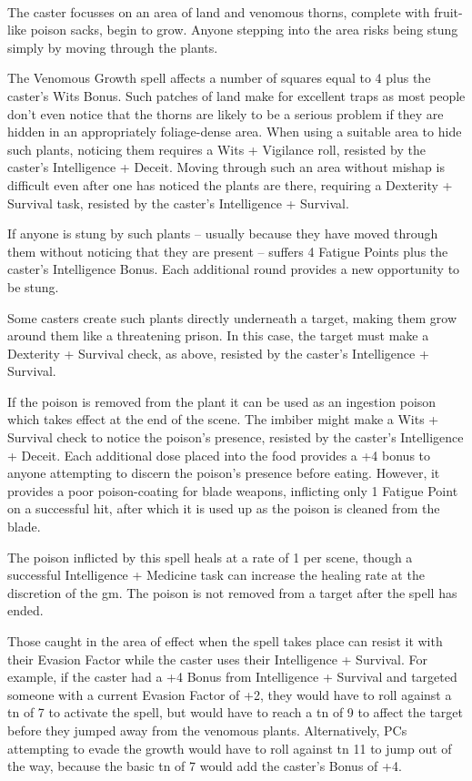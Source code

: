 \begin{multicols}{2}
\\
The caster focusses on an area of land and venomous thorns, complete with fruit-like poison sacks, begin to grow. Anyone stepping into the area risks being stung simply by moving through the plants.

The Venomous Growth spell affects a number of squares equal to 4 plus the caster's Wits Bonus. Such patches of land make for excellent traps as most people don't even notice that the thorns are likely to be a serious problem if they are hidden in an appropriately foliage-dense area. When using a suitable area to hide such plants, noticing them requires a Wits + Vigilance roll, resisted by the caster's Intelligence + Deceit. Moving through such an area without mishap is difficult even after one has noticed the plants are there, requiring a Dexterity + Survival task, resisted by the caster's Intelligence + Survival.

If anyone is stung by such plants -- usually because they have moved through them without noticing that they are present -- suffers 4 Fatigue Points plus the caster's Intelligence Bonus. Each additional \gls{round} provides a new opportunity to be stung.

Some casters create such plants directly underneath a target, making them grow around them like a threatening prison. In this case, the target must make a Dexterity + Survival check, as above, resisted by the caster's Intelligence + Survival.

If the poison is removed from the plant it can be used as an ingestion poison which takes effect at the end of the scene. The imbiber might make a Wits + Survival check to notice the poison's presence, resisted by the caster's Intelligence + Deceit. Each additional dose placed into the food provides a +4 bonus to anyone attempting to discern the poison's presence before eating. However, it provides a poor poison-coating for blade weapons, inflicting only 1 Fatigue Point on a successful hit, after which it is used up as the poison is cleaned from the blade.

The poison inflicted by this spell heals at a rate of 1 per scene, though a successful Intelligence + Medicine task can increase the healing rate at the discretion of the \gls{gm}. The poison is not removed from a target after the spell has ended.

Those caught in the area of effect when the spell takes place can resist it with their Evasion Factor while the caster uses their Intelligence + Survival. For example, if the caster had a +4 Bonus from Intelligence + Survival and targeted someone with a current Evasion Factor of +2, they would have to roll against a \gls{tn} of 7 to activate the spell, but would have to reach a \gls{tn} of 9 to affect the target before they jumped away from the venomous plants. Alternatively, PCs attempting to evade the growth would have to roll against \gls{tn} 11 to jump out of the way, because the basic \gls{tn} of 7 would add the caster's Bonus of +4.


\end{multicols}
